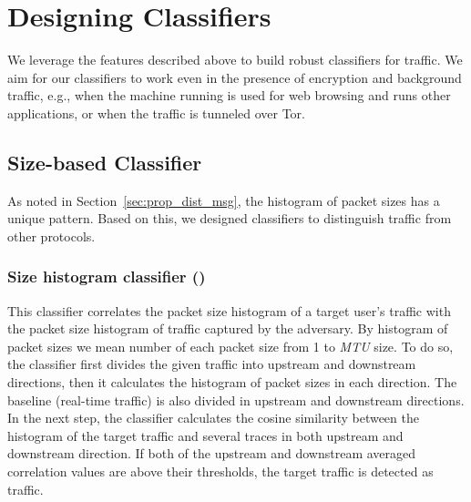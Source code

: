 \section{Designing \bc Classifiers}
We leverage the features described above to build robust classifiers for \bc traffic. 
We aim for our classifiers to work even in the presence of encryption and background traffic, e.g., 
when the machine running \bc is used for web browsing and runs other applications, or when the \bc traffic is tunneled over Tor. %

\subsection{Size-based Classifier}
As noted in Section~\ref{sec:prop_dist_msg}, the histogram of \bc packet sizes has a unique pattern. Based on this, we designed  classifiers to distinguish \bc traffic from other protocols. 

\subsubsection{Size histogram classifier ()}\label{sec:all-packet-size-classifier}

This classifier correlates the packet size histogram of a target user's traffic with the packet size histogram of \bc traffic captured by the adversary. By histogram of packet sizes we mean number of each packet size from 1 to \textit{MTU} size. To do so, the classifier first divides the given traffic into upstream and downstream directions, then it calculates the histogram of packet sizes in each direction. The baseline (real-time \bc traffic) is also divided in upstream and downstream directions. 
In the next step, the classifier calculates the cosine similarity between the histogram of the target traffic and several \bc traces in both upstream and downstream direction. If both of the upstream and downstream averaged correlation values are above their thresholds, the target traffic is detected as \bc traffic.



